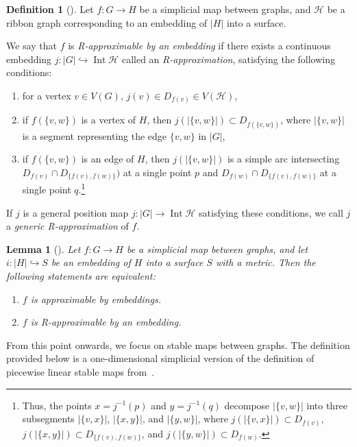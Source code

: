 \documentclass[a4paper,12pt,reqno,oneside]{amsart}
\theoremstyle{plain}
\newtheorem{lemma}{Lemma}
\theoremstyle{definition}
\newtheorem*{definition}{Definition}
\theoremstyle{plain}
\newcommand{\from}{\colon}
\newcommand{\HH}{\mathcal{H}}
\DeclareMathOperator{\Int}{Int}
\begin{document}
\begin{definition}[{\cite[Definition 2.7]{minc}}]\label{def:rapprox}
  Let $f \from G \to H$ be a simplicial map between graphs, and $\HH$ be a ribbon graph
  corresponding to an embedding of $|H|$ into a surface.

  We say that $f$ is \emph{R-approximable by an embedding} if there exists
  a continuous embedding $j \from |G| \hookrightarrow \Int \HH$ called an
  \emph{R-approximation}, satisfying the following conditions:
  \begin{enumerate}
  \item for a vertex $v \in V(G)$, $j(v) \in D_{f(v)} \in V(\HH)$,
  \item if $f(\{v, w\})$ is a vertex of $H$, then $j(|\{v, w\}|)
    \subset D_{f(\{v, w\})}$, where
    $|\{v, w\}|$ is a segment representing the edge $\{v, w\}$ in $|G|$,
  \item if $f(\{v, w\})$ is an edge of $H$, then $j(|\{v, w\}|)$ is a simple arc intersecting
    $D_{f(v)} \cap D_{\{f(v), f(w)\}})$ at a single point $p$ and
    $D_{f(w)} \cap D_{\{f(v), f(w)\}}$ at a single point $q$.\footnote{Thus, the points
      $x = j^{-1}(p)$ and $y = j^{-1}(q)$ decompose $|\{v, w\}|$ into three subsegments
      $|\{v, x\}|$, $|\{x, y\}|$, and $|\{y, w\}|$, where $j(|\{v, x\}|) \subset D_{f(v)}$,
      $j(|\{x, y\}|) \subset D_{\{f(v), f(w)\}}$, and $j(|\{y, w\}|) \subset D_{f(w)}$.}
  \end{enumerate}

  If $j$ is a general position map $j \from |G| \to \Int \HH$ satisfying these conditions, we call
  $j$ a \emph{generic R-approximation} of $f$.
\end{definition}

\begin{lemma}[{\cite[Propositions 2.9]{minc}}]\label{lemma:Rapprox}
  Let $f \from G \to H$ be a simplicial map between graphs, and let $i \from |H| \hookrightarrow S$ be an
  embedding of $H$ into a surface $S$ with a metric. Then the following statements are equivalent:
  \begin{enumerate}
  \item $f$ is approximable by embeddings.
  \item $f$ is R-approximable by an embedding.
  \end{enumerate}
\end{lemma}

From this point onwards, we focus on stable maps between graphs. The definition provided below is
a one-dimensional simplicial version of the definition of piecewise linear stable maps
from~\cite[Appendix B]{mel2}.
\end{document}
